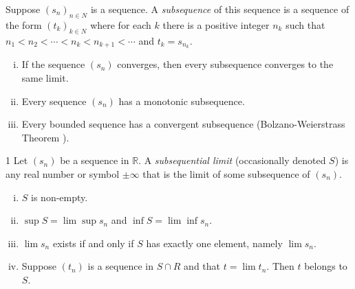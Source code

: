 \begin{defn}{1}
	Suppose $(s_n)_{n\in N}$ is a sequence. A \textit{subsequence} of this sequence is a sequence of the form $(t_k)_{k\in N}$ where for each $k$ there is a positive	integer $n_k$ such that	$n_1 < n_2 < \cdots < n_k < n_{k+1} < \cdots$ and $t_k = s_{n_k}$.
	\begin{enumerate}[(i)]
		\item If the sequence $(s_n)$ converges, then every subsequence converges to the same limit.
		\item Every sequence $(s_n)$ has a monotonic subsequence.
		\item Every bounded sequence has a convergent subsequence (Bolzano-Weierstrass Theorem ).
	\end{enumerate}
\end{defn}


\begin{defn}{1}
	Let $(s_n)$ be a sequence in $\mathbb{R}$. A \textit{subsequential limit} (occasionally denoted $S$) is any real number or symbol $\pm \infty$ that is the limit of some subsequence of $(s_n)$.
	\begin{enumerate}[(i)]
		\item $S$ is non-empty.
		\item $\sup S = \lim \sup s_n$ and $\inf S = \lim \inf s_n$.
		\item $\lim s_n$ exists if and only if $S$ has exactly one element, namely	$\lim s_n$.
		\item Suppose $(t_n)$ is a sequence in $S\cap R$ and that $t = \lim t_n$. Then $t$ belongs
		to $S$.
	\end{enumerate}
\end{defn}

